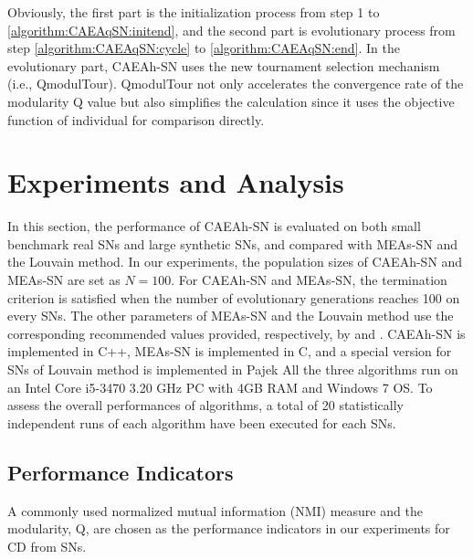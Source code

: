 \documentclass[10pt, journal]{IEEEtran}
\begin{document}
Obviously, the first part is the initialization process from step 1 to \ref{algorithm:CAEAqSN:initend}, and the second part is evolutionary process from step \ref{algorithm:CAEAqSN:cycle} to \ref {algorithm:CAEAqSN:end}. In the evolutionary part, CAEAh-SN uses the new tournament selection mechanism (i.e., QmodulTour). QmodulTour not only accelerates the convergence rate of the modularity Q value but also simplifies the calculation since it uses the objective function of individual for comparison directly.

\section{Experiments and Analysis}\label{section:experiment}
In this section, the performance of CAEAh-SN is evaluated on both small benchmark real SNs and large synthetic SNs, and compared with  MEAs-SN and the Louvain method. In our experiments, the population sizes of CAEAh-SN and MEAs-SN are set as $N=100$. For CAEAh-SN and MEAs-SN, the termination criterion is satisfied when the number of evolutionary generations reaches 100 on every SNs. The other parameters of MEAs-SN and the Louvain method use
the corresponding recommended values provided, respectively, by \cite{liu2014multiobjective} and \cite{blondel2008fast}. CAEAh-SN is implemented in C++, MEAs-SN is implemented in C, and a special version for SNs of Louvain method is implemented in Pajek\cite{mrvar2013pajek} 
All the three algorithms  run on an Intel Core
i5-3470 3.20 GHz PC with 4GB RAM and Windows 7 OS. To assess the overall performances of
algorithms, a total of 20 statistically independent runs of each algorithm have
been executed for each SNs.


\subsection{Performance Indicators}\label{section:experiment:indicators}
A commonly used normalized mutual information (NMI) measure  \cite{Danon2005Comparing} and the modularity, Q\cite{gomez2009analysis}, are chosen as the performance indicators in our experiments for CD from SNs. 
\end{document}
